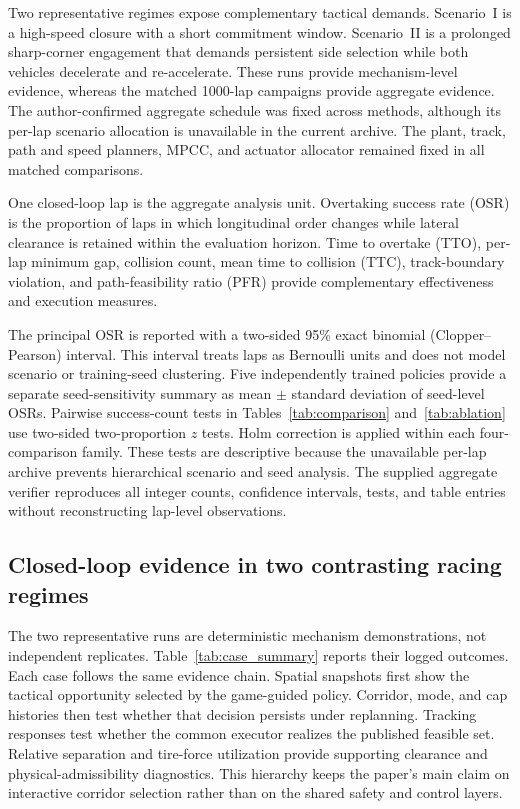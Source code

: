 Two representative regimes expose complementary tactical demands. Scenario~I
is a high-speed closure with a short commitment window. Scenario~II is a
prolonged sharp-corner engagement that demands persistent side selection while
both vehicles decelerate and re-accelerate. These runs provide mechanism-level
evidence, whereas the matched 1000-lap campaigns provide aggregate evidence.
The author-confirmed aggregate schedule was fixed across methods, although its
per-lap scenario allocation is unavailable in the current archive. The plant,
track, path and speed planners, MPCC, and actuator allocator remained fixed in
all matched comparisons.

One closed-loop lap is the aggregate analysis unit. Overtaking success rate
(OSR) is the proportion of laps in which longitudinal order changes while
lateral clearance is retained within the evaluation horizon. Time to overtake
(TTO), per-lap minimum gap, collision count, mean time to collision (TTC),
track-boundary violation, and path-feasibility ratio (PFR) provide complementary
effectiveness and execution measures.

The principal OSR is reported with a two-sided 95\% exact binomial
(Clopper--Pearson) interval. This interval treats laps as Bernoulli units and
does not model scenario or training-seed clustering. Five independently
trained policies provide a separate seed-sensitivity summary as mean $\pm$
standard deviation of seed-level OSRs. Pairwise success-count tests in
Tables~\ref{tab:comparison} and~\ref{tab:ablation} use two-sided
two-proportion $z$ tests. Holm correction is applied within each
four-comparison family. These tests are descriptive because the unavailable
per-lap archive prevents hierarchical scenario and seed analysis. The supplied
aggregate verifier reproduces all integer counts, confidence intervals, tests,
and table entries without reconstructing lap-level observations.

\subsection{Closed-loop evidence in two contrasting racing regimes}
\label{subsec:representative_cases}

The two representative runs are deterministic mechanism demonstrations, not
independent replicates. Table~\ref{tab:case_summary} reports their logged
outcomes. Each case follows the same evidence chain. Spatial snapshots first
show the tactical opportunity selected by the game-guided policy. Corridor,
mode, and cap histories then test whether that decision persists under
replanning. Tracking responses test whether the common executor realizes the
published feasible set. Relative separation and tire-force utilization provide
supporting clearance and physical-admissibility diagnostics. This hierarchy
keeps the paper's main claim on interactive corridor selection rather than on
the shared safety and control layers.

